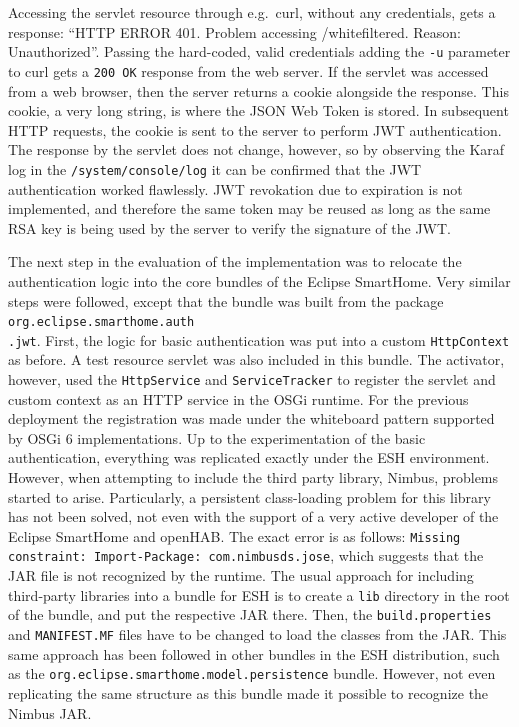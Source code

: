 \documentclass[12pt]{article}
\begin{document}
Accessing the servlet resource through e.g.\ curl, without any credentials, gets a response: ``HTTP ERROR 401. Problem accessing /whitefiltered. Reason: Unauthorized''. Passing the hard-coded, valid credentials adding the \texttt{-u} parameter to curl gets a \texttt{200 OK} response from the web server. If the servlet was accessed from a web browser, then the server returns a cookie alongside the response. This cookie, a very long string, is where the JSON Web Token is stored. In subsequent HTTP requests, the cookie is sent to the server to perform JWT authentication. The response by the servlet does not change, however, so by observing the Karaf log in the \texttt{/system/console/log} it can be confirmed that the JWT authentication worked flawlessly. JWT revokation due to expiration is not implemented, and therefore the same token may be reused as long as the same RSA key is being used by the server to verify the signature of the JWT.

The next step in the evaluation of the implementation was to relocate the authentication logic into the core bundles of the Eclipse SmartHome. Very similar steps were followed, except that the bundle was built from the package \texttt{org.eclipse.smarthome.auth\\.jwt}. First, the logic for basic authentication was put into a custom \texttt{HttpContext} as before. A test resource servlet was also included in this bundle. The activator, however, used the \texttt{HttpService} and \texttt{ServiceTracker} to register the servlet and custom context as an HTTP service in the OSGi runtime. For the previous deployment the registration was made under the whiteboard pattern supported by OSGi 6 implementations. Up to the experimentation of the basic authentication, everything was replicated exactly under the ESH environment. However, when attempting to include the third party library, Nimbus, problems started to arise. Particularly, a persistent class-loading problem for this library has not been solved, not even with the support of a very active developer of the Eclipse SmartHome and openHAB. The exact error is as follows: \texttt{Missing constraint: Import-Package: com.nimbusds.jose}, which suggests that the JAR file is not recognized by the runtime. The usual approach for including third-party libraries into a bundle for ESH is to create a \texttt{lib} directory in the root of the bundle, and put the respective JAR there. Then, the \texttt{build.properties} and \texttt{MANIFEST.MF} files have to be changed to load the classes from the JAR. This same approach has been followed in other bundles in the ESH distribution, such as the \texttt{org.eclipse.smarthome.model.persistence} bundle. However, not even replicating the same structure as this bundle made it possible to recognize the Nimbus JAR.
\end{document}
